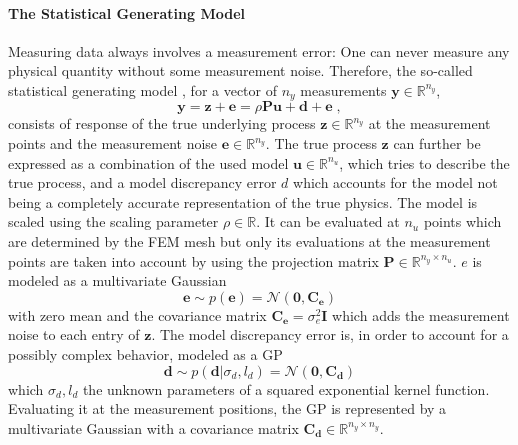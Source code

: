 \documentclass[%
  a4paper,oneside,%
  11pt,%
  smallchapters,
  green,%
  rgb, <cmyk>
  ]{tubsbook}
\begin{document}
\paragraph{The Statistical Generating Model}
Measuring data always involves a measurement error: One can never measure any physical quantity without some measurement noise. Therefore, the so-called statistical generating model \cite{girolami2021}, \cite{kennedy2001} for a vector of $n_y$ measurements $\bm{y} \in \mathbb{R}^{n_y}$, 
%
\begin{equation}
\bm{y} = \bm{z} + \bm{e} = \rho \bm{P} \bm{u} + \bm{d} + \bm{e} \; ,
\label{eqn:statGen}
\end{equation}
%
consists of response of the true underlying process $\bm{z} \in \mathbb{R}^{n_y}$ at the measurement points and the measurement noise $\bm{e} \in \mathbb{R}^{n_y}$. The true process $\bm{z}$ can further be expressed as a combination of the used model $\bm{u} \in \mathbb{R}^{n_u}$, which tries to describe the true process, and a model discrepancy error $d$ which accounts for the model not being a completely accurate representation of the true physics. The model is scaled using the scaling parameter $\rho \in \mathbb{R}$. It can be evaluated at $n_u$ points which are determined by the FEM mesh but only its evaluations at the measurement points are taken into account by using the projection matrix $\bm{P} \in \mathbb{R}^{n_y \times n_u}$.
%
$e$ is modeled as a multivariate Gaussian 
%
\begin{equation}
\bm{e} \sim p(\bm{e}) = \mathcal{N}(\bm{0}, \bm{C_e})
\end{equation}
with zero mean and the covariance matrix $\bm{C_e} = \sigma_e^2 \bm{I}$ which adds the measurement noise to each entry of $\bm{z}$.
%
The model discrepancy error is, in order to account for a possibly complex behavior, modeled as a GP
\begin{equation}
\bm{d} \sim p(\bm{d} | \sigma_d, l_d) = \mathcal{N}(\bm{0},\bm{C_d})
\end{equation}
which $\sigma_d, l_d$ the unknown parameters of a squared exponential kernel function. Evaluating it at the measurement positions, the GP is represented by a multivariate Gaussian with a covariance matrix $\bm{C_d} \in \mathbb{R}^{n_y \times n_y}$.
\end{document}
